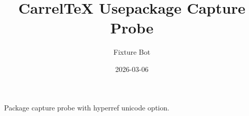 \documentclass{article}
\title{CarrelTeX Usepackage Capture Probe}
\author{Fixture Bot}
\date{2026-03-06}
\begin{document}
\maketitle

Package capture probe with hyperref unicode option.
\end{document}

